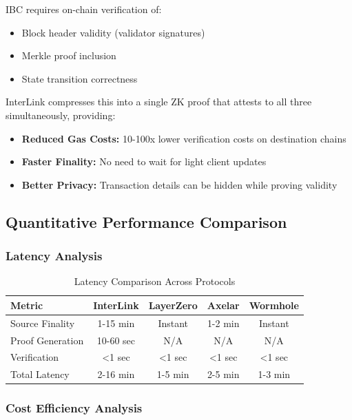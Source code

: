 \documentclass[11pt,a4paper]{article}
\begin{document}
IBC requires on-chain verification of:
\begin{itemize}
    \item Block header validity (validator signatures)
    \item Merkle proof inclusion
    \item State transition correctness
\end{itemize}

InterLink compresses this into a single ZK proof that attests to all three simultaneously, providing:
\begin{itemize}
    \item \textbf{Reduced Gas Costs:} 10-100x lower verification costs on destination chains
    \item \textbf{Faster Finality:} No need to wait for light client updates
    \item \textbf{Better Privacy:} Transaction details can be hidden while proving validity
\end{itemize}

\subsection{Quantitative Performance Comparison}

\subsubsection{Latency Analysis}

\begin{table}[H]
\centering
\begin{tabular}{@{}lcccc@{}}
\toprule
\textbf{Metric} & \textbf{InterLink} & \textbf{LayerZero} & \textbf{Axelar} & \textbf{Wormhole} \\ \midrule
Source Finality & 1-15 min & Instant & 1-2 min & Instant \\
Proof Generation & 10-60 sec & N/A & N/A & N/A \\
Verification & <1 sec & <1 sec & <1 sec & <1 sec \\
Total Latency & 2-16 min & 1-5 min & 2-5 min & 1-3 min \\
\end{tabular}
\caption{Latency Comparison Across Protocols}
\end{table}

\subsubsection{Cost Efficiency Analysis}
\end{document}
